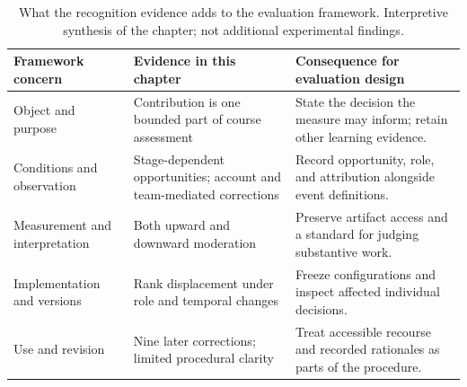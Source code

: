 \begin{table}[htbp]
\caption{What the recognition evidence adds to the evaluation framework. Interpretive synthesis of the chapter; not additional experimental findings.}
\label{tab:ch7-feedback}
\small\renewcommand{\arraystretch}{1.2}
\begin{tabularx}{\linewidth}{@{}>{\raggedright\arraybackslash}p{26mm}>{\raggedright\arraybackslash}X>{\raggedright\arraybackslash}X@{}}\toprule
Framework concern & Evidence in this chapter & Consequence for evaluation design\\\midrule
Object and purpose & Contribution is one bounded part of course assessment & State the decision the measure may inform; retain other learning evidence.\\
Conditions and observation & Stage-dependent opportunities; account and team-mediated corrections & Record opportunity, role, and attribution alongside event definitions.\\
Measurement and interpretation & Both upward and downward moderation & Preserve artifact access and a standard for judging substantive work.\\
Implementation and versions & Rank displacement under role and temporal changes & Freeze configurations and inspect affected individual decisions.\\
Use and revision & Nine later corrections; limited procedural clarity & Treat accessible recourse and recorded rationales as parts of the procedure.\\\bottomrule
\end{tabularx}
\end{table}
